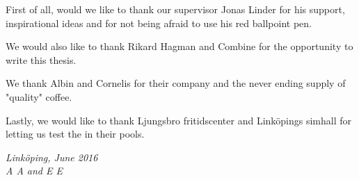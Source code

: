 \begin{acknowledgments}
First of all, would we like to thank our supervisor Jonas Linder for his support, inspirational ideas and for not being afraid to use his red ballpoint pen.

We would also like to thank Rikard Hagman and Combine for the opportunity to write this thesis.

We thank Albin and Cornelis for their company and the never ending supply of "quality" coffee.

Lastly, we would like to thank Ljungsbro fritidscenter and Linköpings simhall for letting us test the \abbrROV in their pools.

  \addvspace{1em}
  \begin{flushright}
    \textit{%
      Linköping, June 2016\\
      A A and E E%
    }
  \end{flushright}
\end{acknowledgments}